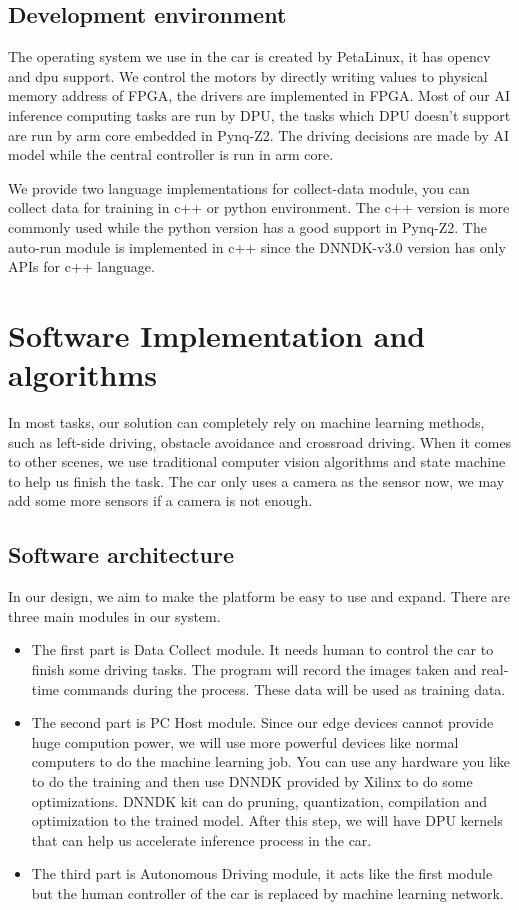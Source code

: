 \documentclass[conference]{IEEEtran}
\begin{document}
\subsection{Development environment}

The operating system we use in the car is created by PetaLinux\cite{b11}, it has opencv and dpu support. We control the motors by directly writing values to physical memory address of FPGA, the drivers are implemented in FPGA. Most of our AI inference computing tasks are run by DPU, the tasks which DPU doesn't support are run by arm core embedded in Pynq-Z2. The driving decisions are made by AI model while the central controller is run in arm core.  

We provide two language implementations for collect-data module, you can collect data for training in c++ or python environment. The c++ version is more commonly used while the python version has a good support in Pynq-Z2. The auto-run module is implemented in c++ since the DNNDK-v3.0\cite{b12} version has only APIs for c++ language.

\section{Software Implementation and algorithms}

In most tasks, our solution can completely rely on machine learning methods, such as left-side driving, obstacle avoidance and crossroad driving. When it comes to other scenes, we use traditional computer vision algorithms and state machine to help us finish the task. The car only uses a camera as the sensor now, we may add some more sensors if a camera is not enough.

\subsection{Software architecture}\label{AA}

In our design, we aim to make the platform be easy to use and expand. There are three main modules in our system.

\begin{itemize}
\item The first part is Data Collect module. It needs human to control the car to finish some driving tasks. The program will record the images taken and real-time commands during the process. These data will be used as training data.
\item The second part is PC Host module. Since our edge devices cannot provide huge compution power, we will use more powerful devices like normal computers to do the machine learning job. You can use any hardware you like to do the training and then use DNNDK provided by Xilinx to do some optimizations. DNNDK kit can do pruning, quantization, compilation and optimization to the trained model. After this step, we will have DPU kernels that can help us accelerate inference process in the car.
\item The third part is Autonomous Driving module, it acts like the first module but the human controller of the car is replaced by machine learning network.
\end{itemize}
\end{document}
